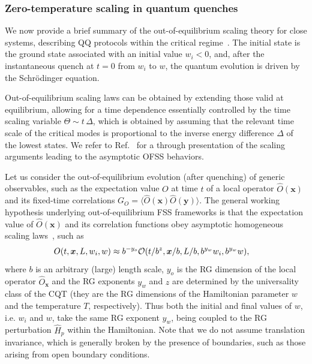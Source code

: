 \subsubsection{Zero-temperature scaling in quantum quenches}
\label{zeroT}

We now provide a brief summary of the out-of-equilibrium scaling
theory for close systems, describing QQ protocols within the critical
regime~\cite{pelissetto2017dynamic,rossini2021coherent}. The initial state is the ground state
associated with an initial value $w_i<0$, and, after the instantaneous
quench at $t=0$ from $w_i$ to $w$, the quantum evolution is driven by
the Schr\"odinger equation.

Out-of-equilibrium scaling laws can be obtained by extending those
valid at equilibrium, allowing for a time dependence essentially
controlled by the time scaling variable $\Theta \sim t\,\Delta$, which
is obtained by assuming that the relevant time scale of the critical
modes is proportional to the inverse energy difference $\Delta$ of the
lowest states. We refer to Ref.~\cite{rossini2021coherent} for a through
presentation of the scaling arguments leading to the asymptotic OFSS
behaviors.

Let us consider the out-of-equilibrium evolution (after quenching) of
generic observables, such as the expectation value $O$ at time $t$ of
a local operator $\hat{O}({\bm x})$ and its fixed-time correlations
$G_O=\langle \hat{O}({\bm x}) \hat{O}({\bm y})\rangle$. The general
working hypothesis underlying out-of-equilibrium FSS frameworks is
that the expectation value of $\hat{O}({\bm x})$ and its correlation
functions obey asymptotic homogeneous scaling laws~\cite{rossini2021coherent}, such
as
\begin{eqnarray}
O(t, {\bm x}, L, w_i, w) \approx  b^{-y_o} {\cal O}(t/b^z,
{\bm x}/b, L/b, b^{y_w} w_i, b^{y_w} w),\quad
    \label{Oscaquefss0}
\end{eqnarray}
  where $b$ is an arbitrary (large) length scale, $y_o$ is the RG
  dimension of the local operator $\hat{O}_{\bm x}$ and the RG
  exponents $y_w$ and $z$ are determined by the universality class of
  the CQT (they are the RG dimensions of the Hamiltonian parameter $w$
  and the temperature $T$, respectively). Thus both the initial and
  final values of $w$, i.e.  $w_i$ and $w$, take the same RG exponent
  $y_w$, being coupled to the RG perturbation ${\hat H}_p$ within the
  Hamiltonian. Note that we do not assume translation invariance,
  which is generally broken by the presence of boundaries, such as
  those arising from open boundary conditions.
  
